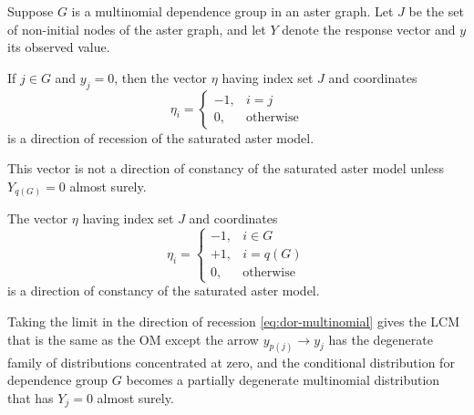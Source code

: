 \begin{theorem} \label{th:dor-multinomial}
Suppose $G$ is a multinomial dependence group in an aster graph.
Let $J$ be the set of non-initial nodes of the aster graph,
and let $Y$ denote the response vector and $y$ its observed value.

If $j \in G$ and $y_j = 0$, then the vector $\eta$ having index set $J$
and coordinates
\begin{equation} \label{eq:dor-multinomial}
   \eta_i = \begin{cases} -1, & i = j \\
   0, & \text{otherwise} \end{cases}
\end{equation}
is a direction of recession of the saturated aster model.

This vector is not a direction of constancy
of the saturated aster model unless $Y_{q(G)} = 0$ almost surely.

The vector $\eta$ having index set $J$ and coordinates
\begin{equation} \label{eq:doc-multinomial}
   \eta_i = \begin{cases} -1, & i \in G \\
   +1, & i = q(G) \\
   0, & \text{otherwise} \end{cases}
\end{equation}
is a direction of constancy of the saturated aster model.

Taking the limit in the direction of recession \eqref{eq:dor-multinomial}
gives the LCM that is the same as the OM except the arrow
$y_{p(j)} \longrightarrow y_j$ has the degenerate family of distributions
concentrated at zero, and the conditional distribution for dependence group
$G$ becomes a partially degenerate multinomial distribution that has
$Y_j = 0$ almost surely.
\end{theorem}
